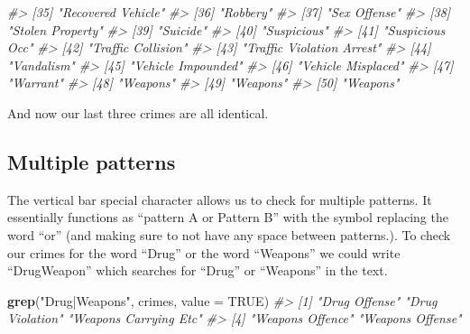 \documentclass[
  12pt,
]{book}
\newenvironment{Shaded}{\begin{snugshade}}{\end{snugshade}}
\newcommand{\CommentTok}[1]{\textcolor[rgb]{0.37,0.37,0.37}{\textit{#1}}}
\newcommand{\DataTypeTok}[1]{\textcolor[rgb]{0.27,0.27,0.27}{#1}}
\newcommand{\KeywordTok}[1]{\textcolor[rgb]{0.27,0.27,0.27}{\textbf{#1}}}
\newcommand{\NormalTok}[1]{#1}
\newcommand{\OtherTok}[1]{\textcolor[rgb]{0.37,0.37,0.37}{#1}}
\newcommand{\StringTok}[1]{\textcolor[rgb]{0.5,0.5,0.5}{#1}}
\begin{document}
\begin{Shaded}
\begin{Highlighting}[]
\CommentTok{\#> [35] "Recovered Vehicle"                         }
\CommentTok{\#> [36] "Robbery"                                   }
\CommentTok{\#> [37] "Sex Offense"                               }
\CommentTok{\#> [38] "Stolen Property"                           }
\CommentTok{\#> [39] "Suicide"                                   }
\CommentTok{\#> [40] "Suspicious"                                }
\CommentTok{\#> [41] "Suspicious Occ"                            }
\CommentTok{\#> [42] "Traffic Collision"                         }
\CommentTok{\#> [43] "Traffic Violation Arrest"                  }
\CommentTok{\#> [44] "Vandalism"                                 }
\CommentTok{\#> [45] "Vehicle Impounded"                         }
\CommentTok{\#> [46] "Vehicle Misplaced"                         }
\CommentTok{\#> [47] "Warrant"                                   }
\CommentTok{\#> [48] "Weapons"                                   }
\CommentTok{\#> [49] "Weapons"                                   }
\CommentTok{\#> [50] "Weapons"}
\end{Highlighting}
\end{Shaded}

And now our last three crimes are all identical.

\hypertarget{multiple-patterns}{%
\subsection{\texorpdfstring{Multiple patterns \texttt{\textbar{}}}{Multiple patterns \textbar{}}}\label{multiple-patterns}}

The vertical bar \texttt{\textbar{}} special character allows us to check for multiple patterns. It essentially functions as ``pattern A or Pattern B'' with the \texttt{\textbar{}} symbol replacing the word ``or'' (and making sure to not have any space between patterns.). To check our crimes for the word ``Drug'' or the word ``Weapons'' we could write ``Drug\textbar Weapon'' which searches for ``Drug'' or ``Weapons'' in the text.

\begin{Shaded}
\begin{Highlighting}[]
\KeywordTok{grep}\NormalTok{(}\StringTok{"Drug|Weapons"}\NormalTok{, crimes, }\DataTypeTok{value =} \OtherTok{TRUE}\NormalTok{)}
\CommentTok{\#> [1] "Drug Offense"         "Drug Violation"       "Weapons Carrying Etc"}
\CommentTok{\#> [4] "Weapons Offence"      "Weapons Offense"}
\end{Highlighting}
\end{Shaded}
\end{document}
